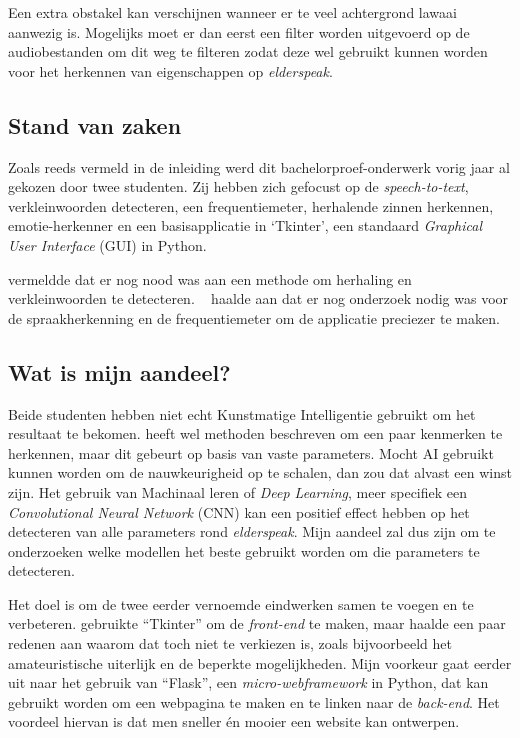 Een extra obstakel kan verschijnen wanneer er te veel achtergrond lawaai aanwezig is. Mogelijks moet er dan eerst een filter worden uitgevoerd op de audiobestanden om dit weg te filteren zodat deze wel gebruikt kunnen worden voor het herkennen van eigenschappen op \textit{elderspeak}.

\subsection{Stand van zaken}\label{subsec:stand-van-zaken}

Zoals reeds vermeld in de inleiding werd dit bachelorproef-onderwerk vorig jaar al gekozen door twee studenten.
Zij hebben zich gefocust op de \textit{speech-to-text}, verkleinwoorden detecteren, een frequentiemeter, herhalende zinnen herkennen, emotie-herkenner en een basisapplicatie in `Tkinter', een standaard \textit{Graphical User Interface} (GUI) in Python.

\textcite{Beeckman2021} vermeldde dat er nog nood was aan een methode om herhaling en verkleinwoorden te detecteren. ~\textcite{Standaert2021} haalde aan dat er nog onderzoek nodig was voor de spraakherkenning en de frequentiemeter om de applicatie preciezer te maken.

\subsection{Wat is mijn aandeel?}\label{subsec:watismijnadeel}

Beide studenten hebben niet echt Kunstmatige Intelligentie gebruikt om het resultaat te bekomen. \textcite{Standaert2021} heeft wel methoden beschreven om een paar kenmerken te herkennen, maar dit gebeurt op basis van vaste parameters.
Mocht AI gebruikt kunnen worden om de nauwkeurigheid op te schalen, dan zou dat alvast een winst zijn.
Het gebruik van Machinaal leren of \textit{Deep Learning}, meer specifiek een \textit{Convolutional Neural Network} (CNN) kan een positief effect hebben op het detecteren van alle parameters rond \textit{elderspeak}. Mijn aandeel zal dus zijn om te onderzoeken welke modellen het beste gebruikt worden om die parameters te detecteren.

Het doel is om de twee eerder vernoemde eindwerken samen te voegen en te verbeteren. \textcite{Beeckman2021} gebruikte ``Tkinter'' om de \textit{front-end} te maken, maar haalde een paar redenen aan waarom dat toch niet te verkiezen is, zoals bijvoorbeeld het amateuristische uiterlijk en de beperkte mogelijkheden.
Mijn voorkeur gaat eerder uit naar het gebruik van ``Flask'', een \textit{micro-webframework} in Python, dat kan gebruikt worden om een webpagina te maken en te linken naar de \textit{back-end}.
Het voordeel hiervan is dat men sneller én mooier een website kan ontwerpen.


